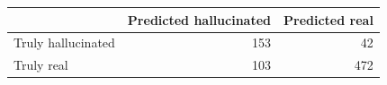 \begin{tabular}{lrr}
\toprule
 & Predicted hallucinated & Predicted real \\
\midrule
Truly hallucinated & 153 & 42 \\
Truly real         & 103 & 472 \\
\bottomrule
\end{tabular}
